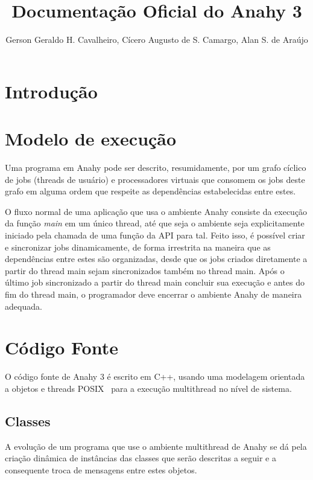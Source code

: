 \documentclass[12pt]{article}
\title{Documentação Oficial do Anahy 3}
\author{Gerson Geraldo H. Cavalheiro, Cícero Augusto de S. Camargo, Alan S. de Araújo}
\begin{document}
\maketitle

\section{Introdução} %


\section{Modelo de execução} %

Uma programa em Anahy pode ser descrito, resumidamente, por um grafo cíclico de
jobs (threads de usuário) e processadores virtuais que consomem os jobs deste
grafo em alguma ordem que respeite as dependências estabelecidas entre estes.

O fluxo normal de uma aplicação que usa o ambiente Anahy consiste da execução
da função \textit{main} em um único thread, até que seja o ambiente seja
explicitamente iniciado pela chamada de uma função da API para tal. Feito
isso, é possível criar e sincronizar jobs dinamicamente, de forma irrestrita
na maneira que as dependências entre estes são organizadas, desde que os jobs
criados diretamente a partir do thread main sejam sincronizados também no
thread main. Após o último job sincronizado a partir do thread main concluir
sua execução e antes do fim do thread main, o programador deve encerrar o
ambiente Anahy de maneira adequada.


\section{Código Fonte} %

O código fonte de Anahy 3 é escrito em C++, usando uma modelagem orientada a
objetos e threads POSIX~\cite{NicholsPthreads} para a execução multithread no
nível de sistema.

\subsection{Classes} %

A evolução de um programa que use o ambiente multithread de Anahy se dá pela
criação dinâmica de instâncias das classes que serão descritas a seguir e a consequente troca de
mensagens entre estes objetos.
\end{document}
